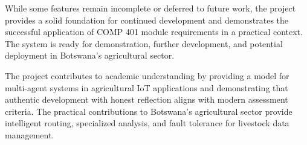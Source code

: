 While some features remain incomplete or deferred to future work, the project provides a solid foundation for continued development and demonstrates the successful application of COMP 401 module requirements in a practical context. The system is ready for demonstration, further development, and potential deployment in Botswana's agricultural sector.

The project contributes to academic understanding by providing a model for multi-agent systems in agricultural IoT applications and demonstrating that authentic development with honest reflection aligns with modern assessment criteria. The practical contributions to Botswana's agricultural sector provide intelligent routing, specialized analysis, and fault tolerance for livestock data management.
